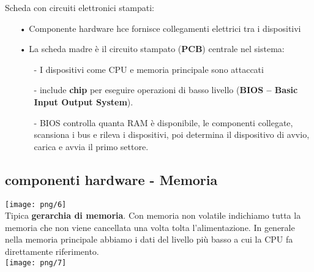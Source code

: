 \documentclass[12pt, letterpaper]{article}
\begin{document}
Scheda con circuiti elettronici stampati:
\begin{itemize}
   \item[•] Componente hardware hce fornisce collegamenti elettrici tra i dispositivi
   \item[•] La scheda madre è il circuito stampato (\textbf{PCB}) centrale nel sistema:
      \begin{itemize}
         \item[-] I dispositivi come CPU e memoria principale sono attaccati
         \item[-] include \textbf{chip} per eseguire operazioni di basso livello (\textbf{BIOS – Basic Input Output System}).
         \item[-] BIOS controlla quanta RAM è disponibile, le componenti
collegate, scansiona i bus e rileva i dispositivi, poi determina il
dispositivo di avvio, carica e avvia il primo settore.
      \end{itemize}
\end{itemize}

\subsection{componenti hardware - Memoria}

\texttt{[image: png/6]}
\\
Tipica \textbf{gerarchia di memoria}. Con memoria non volatile indichiamo tutta la memoria che non viene cancellata una volta tolta l'alimentazione. In generale nella memoria principale abbiamo 
i dati del livello più basso a cui la CPU fa direttamente riferimento.
\\
\texttt{[image: png/7]}
\end{document}
